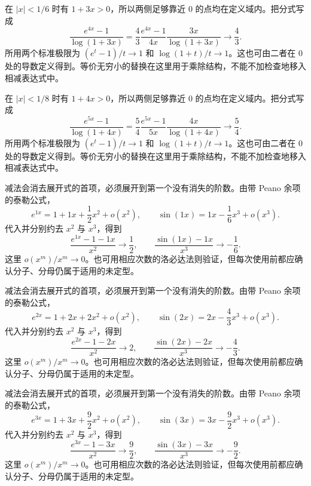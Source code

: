 \documentclass[12pt,fontset=fandol]{ctexart}
\begin{document}
\begin{solve}\label{ans:c3q18}
在 $|x|<1/6$ 时有 $1+3x>0$，所以两侧足够靠近 $0$ 的点均在定义域内。把分式写成
\[
\frac{e^{4x}-1}{\log(1+3x)}=\frac{4}{3}\frac{e^{4x}-1}{4x}\frac{3x}{\log(1+3x)}\longrightarrow \frac{4}{3}.
\]
所用两个标准极限为 $(e^t-1)/t\to1$ 和 $\log(1+t)/t\to1$。这也可由二者在 $0$ 处的导数定义得到。等价无穷小的替换在这里用于乘除结构，不能不加检查地移入相减表达式中。
\end{solve}

\begin{solve}\label{ans:c3q19}
在 $|x|<1/8$ 时有 $1+4x>0$，所以两侧足够靠近 $0$ 的点均在定义域内。把分式写成
\[
\frac{e^{5x}-1}{\log(1+4x)}=\frac{5}{4}\frac{e^{5x}-1}{5x}\frac{4x}{\log(1+4x)}\longrightarrow \frac{5}{4}.
\]
所用两个标准极限为 $(e^t-1)/t\to1$ 和 $\log(1+t)/t\to1$。这也可由二者在 $0$ 处的导数定义得到。等价无穷小的替换在这里用于乘除结构，不能不加检查地移入相减表达式中。
\end{solve}

\begin{solve}\label{ans:c3q20}
减法会消去展开式的首项，必须展开到第一个没有消失的阶数。由带 Peano 余项的泰勒公式，
\[
e^{1x}=1+1x+\frac{1}{2}x^2+o(x^2),\qquad\sin(1x)=1x-\frac{1}{6}x^3+o(x^3).
\]
代入并分别约去 $x^2$ 与 $x^3$，得到
\[
\frac{e^{1x}-1-1x}{x^2}\to \frac{1}{2},\qquad\frac{\sin(1x)-1x}{x^3}\to-\frac{1}{6}.
\]
这里 $o(x^m)/x^m\to0$。也可用相应次数的洛必达法则验证，但每次使用前都应确认分子、分母仍属于适用的未定型。
\end{solve}

\begin{solve}\label{ans:c3q21}
减法会消去展开式的首项，必须展开到第一个没有消失的阶数。由带 Peano 余项的泰勒公式，
\[
e^{2x}=1+2x+2x^2+o(x^2),\qquad\sin(2x)=2x-\frac{4}{3}x^3+o(x^3).
\]
代入并分别约去 $x^2$ 与 $x^3$，得到
\[
\frac{e^{2x}-1-2x}{x^2}\to 2,\qquad\frac{\sin(2x)-2x}{x^3}\to-\frac{4}{3}.
\]
这里 $o(x^m)/x^m\to0$。也可用相应次数的洛必达法则验证，但每次使用前都应确认分子、分母仍属于适用的未定型。
\end{solve}

\begin{solve}\label{ans:c3q22}
减法会消去展开式的首项，必须展开到第一个没有消失的阶数。由带 Peano 余项的泰勒公式，
\[
e^{3x}=1+3x+\frac{9}{2}x^2+o(x^2),\qquad\sin(3x)=3x-\frac{9}{2}x^3+o(x^3).
\]
代入并分别约去 $x^2$ 与 $x^3$，得到
\[
\frac{e^{3x}-1-3x}{x^2}\to \frac{9}{2},\qquad\frac{\sin(3x)-3x}{x^3}\to-\frac{9}{2}.
\]
这里 $o(x^m)/x^m\to0$。也可用相应次数的洛必达法则验证，但每次使用前都应确认分子、分母仍属于适用的未定型。
\end{solve}
\end{document}
